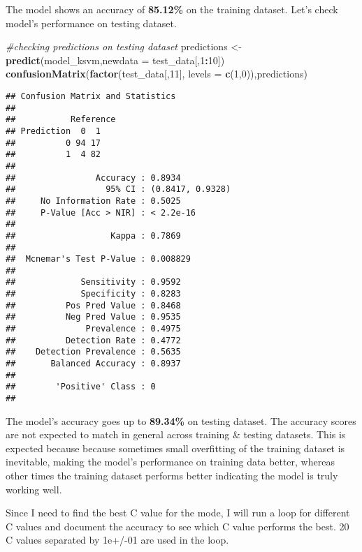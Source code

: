 \documentclass[
]{article}
\newenvironment{Shaded}{\begin{snugshade}}{\end{snugshade}}
\newcommand{\CommentTok}[1]{\textcolor[rgb]{0.56,0.35,0.01}{\textit{#1}}}
\newcommand{\DataTypeTok}[1]{\textcolor[rgb]{0.13,0.29,0.53}{#1}}
\newcommand{\DecValTok}[1]{\textcolor[rgb]{0.00,0.00,0.81}{#1}}
\newcommand{\KeywordTok}[1]{\textcolor[rgb]{0.13,0.29,0.53}{\textbf{#1}}}
\newcommand{\NormalTok}[1]{#1}
\newcommand{\OperatorTok}[1]{\textcolor[rgb]{0.81,0.36,0.00}{\textbf{#1}}}
\newcommand{\StringTok}[1]{\textcolor[rgb]{0.31,0.60,0.02}{#1}}
\begin{document}
The model shows an accuracy of \textbf{85.12\%} on the training dataset.
Let's check model's performance on testing dataset.

\begin{Shaded}
\begin{Highlighting}[]
\CommentTok{#checking predictions on testing dataset}
\NormalTok{predictions <-}\StringTok{ }\KeywordTok{predict}\NormalTok{(model_ksvm,}\DataTypeTok{newdata =}\NormalTok{ test_data[,}\DecValTok{1}\OperatorTok{:}\DecValTok{10}\NormalTok{])}
\KeywordTok{confusionMatrix}\NormalTok{(}\KeywordTok{factor}\NormalTok{(test_data[,}\DecValTok{11}\NormalTok{], }\DataTypeTok{levels =} \KeywordTok{c}\NormalTok{(}\DecValTok{1}\NormalTok{,}\DecValTok{0}\NormalTok{)),predictions)}
\end{Highlighting}
\end{Shaded}

\begin{verbatim}
## Confusion Matrix and Statistics
## 
##           Reference
## Prediction  0  1
##          0 94 17
##          1  4 82
##                                           
##                Accuracy : 0.8934          
##                  95% CI : (0.8417, 0.9328)
##     No Information Rate : 0.5025          
##     P-Value [Acc > NIR] : < 2.2e-16       
##                                           
##                   Kappa : 0.7869          
##                                           
##  Mcnemar's Test P-Value : 0.008829        
##                                           
##             Sensitivity : 0.9592          
##             Specificity : 0.8283          
##          Pos Pred Value : 0.8468          
##          Neg Pred Value : 0.9535          
##              Prevalence : 0.4975          
##          Detection Rate : 0.4772          
##    Detection Prevalence : 0.5635          
##       Balanced Accuracy : 0.8937          
##                                           
##        'Positive' Class : 0               
## 
\end{verbatim}

The model's accuracy goes up to \textbf{89.34\%} on testing dataset. The
accuracy scores are not expected to match in general across training \&
testing datasets. This is expected because because sometimes small
overfitting of the training dataset is inevitable, making the model's
performance on training data better, whereas other times the training
dataset performs better indicating the model is truly working well.

Since I need to find the best C value for the mode, I will run a loop
for different C values and document the accuracy to see which C value
performs the best. 20 C values separated by 1e+/-01 are used in the
loop.
\end{document}
